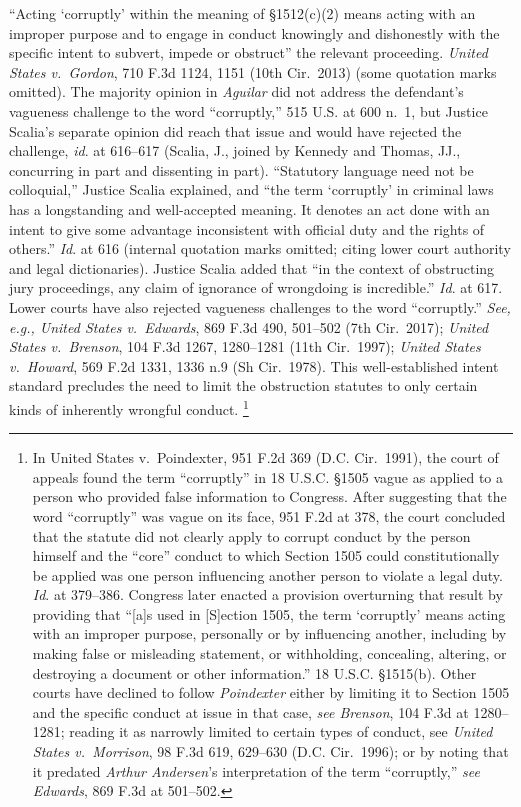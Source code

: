 “Acting ‘corruptly’ within the meaning of \S 1512(c)(2) means acting with an improper purpose and to engage in conduct knowingly and dishonestly with the specific intent to subvert, impede or obstruct” the relevant proceeding.
\textit{United States v.\ Gordon}, 710 F.3d 1124, 1151 (10th Cir.~2013) (some quotation marks omitted).
The majority opinion in \textit{Aguilar} did not address the defendant’s vagueness challenge to the word “corruptly,” 515 U.S. at 600 n.~1, but Justice Scalia’s separate opinion did reach that issue and would have rejected the challenge, \textit{id}. at 616--617 (Scalia, J., joined by Kennedy and Thomas, JJ., concurring in part and dissenting in part).
“Statutory language need not be colloquial,” Justice Scalia explained, and “the term ‘corruptly’ in criminal laws has a longstanding and well-accepted meaning.
It denotes an act done with an intent to give some advantage inconsistent with official duty and the rights of others.”
\textit{Id}. at 616 (internal quotation marks omitted; citing lower court authority and legal dictionaries).
Justice Scalia added that “in the context of obstructing jury proceedings, any claim of ignorance of wrongdoing is incredible.”
\textit{Id}. at 617.
Lower courts have also rejected vagueness challenges to the word “corruptly.”
\textit{See, e.g., United States v.\ Edwards}, 869 F.3d 490, 501--502 (7th Cir.~2017);
\textit{United States v.\ Brenson}, 104 F.3d 1267, 1280--1281 (11th Cir.~1997);
\textit{United States v.\ Howard}, 569 F.2d 1331, 1336 n.9 (Sh Cir.~1978).
This well-established intent standard precludes the need to limit the obstruction statutes to only certain kinds of inherently wrongful conduct.%
\footnote{In United States v.\ Poindexter, 951 F.2d 369 (D.C. Cir.~1991), the court of appeals found the term “corruptly” in 18 U.S.C. \S 1505 vague as applied to a person who provided false information to Congress.
After suggesting that the word “corruptly” was vague on its face, 951 F.2d at 378, the court concluded that the statute did not clearly apply to corrupt conduct by the person himself and the “core” conduct to which Section 1505 could constitutionally be applied was one person influencing another person to violate a legal duty.
\textit{Id}. at 379--386.
Congress later enacted a provision overturning that result by providing that “[a]s used in [S]ection 1505, the term ‘corruptly’ means acting with an improper purpose, personally or by influencing another, including by making false or misleading statement, or withholding, concealing, altering, or destroying a document or other information.”
18 U.S.C. \S 1515(b).
Other courts have declined to follow \textit{Poindexter} either by limiting it to Section 1505 and the specific conduct at issue in that case, \textit{see Brenson}, 104 F.3d at 1280--1281;
reading it as narrowly limited to certain types of conduct, see \textit{United States v.\ Morrison}, 98 F.3d 619, 629--630 (D.C. Cir.~1996);
or by noting that it predated \textit{Arthur Andersen}’s interpretation of the term “corruptly,” \textit{see Edwards}, 869 F.3d at 501--502.
 }

